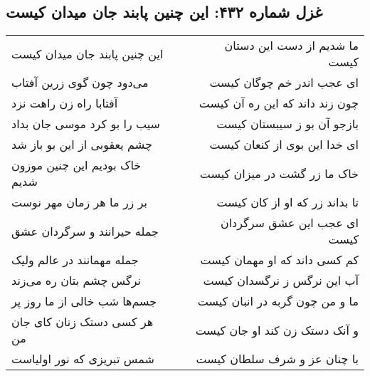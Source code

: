 \begin{center}
\section*{غزل شماره ۴۳۲: این چنین پابند جان میدان کیست}
\label{sec:0432}
\begin{longtable}{l p{0.5cm} r}
این چنین پابند جان میدان کیست
&&
ما شدیم از دست این دستان کیست
\\
می‌دود چون گوی زرین آفتاب
&&
ای عجب اندر خم چوگان کیست
\\
آفتابا راه زن راهت نزد
&&
چون زند داند که این ره آن کیست
\\
سیب را بو کرد موسی جان بداد
&&
بازجو آن بو ز سیبستان کیست
\\
چشم یعقوبی از این بو باز شد
&&
ای خدا این بوی از کنعان کیست
\\
خاک بودیم این چنین موزون شدیم
&&
خاک ما زر گشت در میزان کیست
\\
بر زر ما هر زمان مهر نوست
&&
تا بداند زر که او از کان کیست
\\
جمله حیرانند و سرگردان عشق
&&
ای عجب این عشق سرگردان کیست
\\
جمله مهمانند در عالم ولیک
&&
کم کسی داند که او مهمان کیست
\\
نرگس چشم بتان ره می‌زند
&&
آب این نرگس ز نرگسدان کیست
\\
جسم‌ها شب خالی از ما روز پر
&&
ما و من چون گربه در انبان کیست
\\
هر کسی دستک زنان کای جان من
&&
و آنک دستک زن کند او جان کیست
\\
شمس تبریزی که نور اولیاست
&&
با چنان عز و شرف سلطان کیست
\\
\end{longtable}
\end{center}
